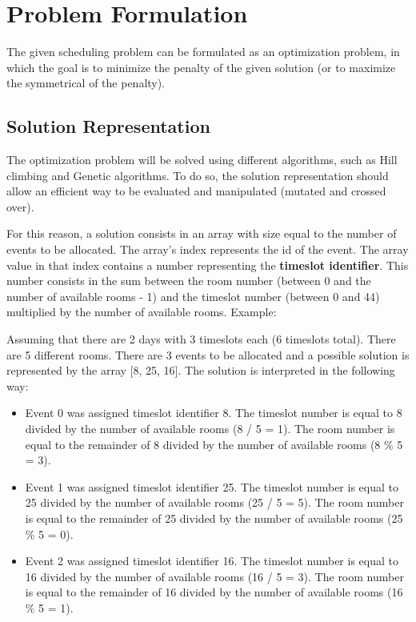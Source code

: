 \documentclass[conference]{IEEEtran}
\begin{document}
\section{Problem Formulation}

The given scheduling problem can be formulated as an optimization problem, in which the goal is to minimize the penalty of the given solution (or to maximize the symmetrical of the penalty).

\subsection{Solution Representation}

The optimization problem will be solved using different algorithms, such as Hill climbing and Genetic algorithms. To do so, the solution representation should allow an efficient way to be evaluated and manipulated (mutated and crossed over). 

For this reason, a solution consists in an array with size equal to the number of events to be allocated. The array's index represents the id of the event. The array value in that index contains a number representing the \textbf{timeslot identifier}. This number consists in the sum between the room number (between 0 and the number of available rooms - 1) and the timeslot number (between 0 and 44) multiplied by the number of available rooms. Example:

Assuming that there are 2 days with 3 timeslots each (6 timeslots total). There are 5 different rooms. There are 3 events to be allocated and a possible solution is represented by the array [8, 25, 16]. The solution is interpreted in the following way:

\begin{itemize}
    \item Event 0 was assigned timeslot identifier 8. The timeslot number is equal to 8 divided by the number of available rooms (8 / 5 = 1). The room number is equal to the remainder of 8 divided by the number of available rooms (8 \% 5 = 3).
    \item Event 1 was assigned timeslot identifier 25. The timeslot number is equal to 25 divided by the number of available rooms (25 / 5 = 5). The room number is equal to the remainder of 25 divided by the number of available rooms (25 \% 5 = 0).
    \item Event 2 was assigned timeslot identifier 16. The timeslot number is equal to 16 divided by the number of available rooms (16 / 5 = 3). The room number is equal to the remainder of 16 divided by the number of available rooms (16 \% 5 = 1).
\end{itemize}
\end{document}

